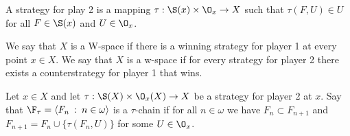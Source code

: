 \documentclass{article}
\begin{document}
A strategy for play 2 is a mapping \(\tau: \S(x) \times \O_x \to X\) such that \(\tau(F, U) \in U\) for all \(F \in \S(x)\) and \(U \in \O_x\).

\begin{defn}
    We say that \(X\) is a W-space if there is a winning strategy for player 1 at every point \(x \in X\).  We say that \(X\) is a w-space if for every strategy for player 2 there exists a counterstrategy for player 1 that wins.
\end{defn}

\begin{defn}
    Let \(x \in X\) and let \(\tau: \S(X) \times \O_x(X) \to X\) be a strategy for player 2 at \(x\). Say that \(\F_{\tau} = \langle F_n  \: : \: n \in \omega\rangle\) is a \(\tau\)-chain if for all \(n \in \omega\) we have \(F_n \subset F_{n + 1}\) and \(F_{n + 1} = F_n \cup \{\tau(F_n, U)\}\) for some \(U \in \O_x\).
\end{defn}
\end{document}
